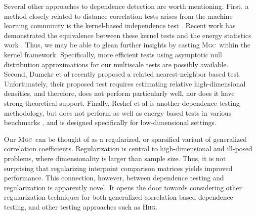 \documentclass[11pt]{article}
\providecommand{\sct}[1]{{\normalfont\textsc{#1}}}
\newcommand{\Mgc}{\sct{Mgc}}
\newcommand{\Hhg}{\sct{Hhg}}
\begin{document}
Several other approaches to dependence detection are worth mentioning.
First, a method closely related to distance correlation tests arises from the machine learning community is the kernel-based independence test  \cite{GrettonEtAl2005, GrettonGyorfi2010, GrettonEtAl2012}.  Recent work has demonstrated the equivalence between these kernel tests and the energy statistics work \cite{SejdinovicEtAl2013, RamdasEtAl2015}. Thus, we may be able to glean further insights by casting \Mgc~within the kernel framework. Specifically, more efficient tests using asymptotic null distribution approximations for our multiscale tests are possibly available.
Second, Dumcke et al \cite{Dumcke2014} recently proposed a related nearest-neighbor based test.  Unfortunately, their proposed test requires estimating relative high-dimensional densities, and therefore, does not perform particularly well, nor does it have strong theoretical support.
Finally, Reshef et al \cite{Reshef2011} is another dependence testing methodology, but does not perform as well as energy based tests in various benchmarks \cite{SimonTibshirani2012}, and is designed specifically for low-dimensional settings.

Our \Mgc~can be thought of as a regularized, or sparsified variant of generalized correlation coefficients.  Regularization is central to high-dimensional and ill-posed problems, where dimensionality is larger than sample size.  Thus, it is not surprising that regularizing interpoint comparison matrices yields improved performance.  This connection, however, between dependence testing and regularization is apparently novel.  It opens the door towards considering other regularization techniques for both generalized correlation based dependence testing, and other testing approaches such as \Hhg. 




\end{document}
